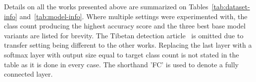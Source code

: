 \documentclass[english,twoside,openright]{UH_DS_MSc}
\begin{document}
Details on all the works presented above are summarized on Tables~\ref{tab:dataset-info} and~\ref{tab:model-info}. Where multiple settings 
were experimented with, the class count producing the highest accuracy score and the three best 
base model variants are listed for brevity. The Tibetan detection article~\cite{4zhaoTibetan}
is omitted due to transfer setting being different to the other works. Replacing the last layer with a 
softmax layer with output size equal to target class count is not 
stated in the table as it is done in every case. The shorthand 'FC' is used to denote a fully connected layer.

\begin{table}[h!]
\centering
{}
\caption{Literature Summary: Datasets}
\label{tab:dataset-info}
\end{table}
\end{document}
